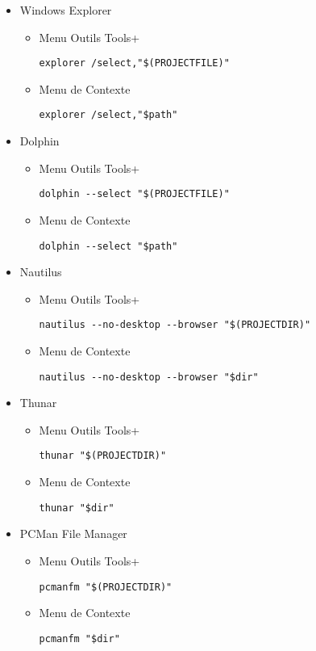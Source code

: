 \begin{itemize}
\item Windows Explorer
\begin{itemize}
\item Menu Outils Tools+
\begin{verbatim}
explorer /select,"$(PROJECTFILE)"
\end{verbatim}
\item Menu de Contexte
\begin{verbatim}
explorer /select,"$path"
\end{verbatim}
\end{itemize}

\item Dolphin
\begin{itemize}
\item Menu Outils Tools+
\begin{verbatim}
dolphin --select "$(PROJECTFILE)"
\end{verbatim}
\item Menu de Contexte
\begin{verbatim}
dolphin --select "$path"
\end{verbatim}
\end{itemize}


\item Nautilus
\begin{itemize}
\item Menu Outils Tools+
\begin{verbatim}
nautilus --no-desktop --browser "$(PROJECTDIR)"
\end{verbatim}
\item Menu de Contexte
\begin{verbatim}
nautilus --no-desktop --browser "$dir"
\end{verbatim}
\end{itemize}

\item Thunar
\begin{itemize}
\item Menu Outils Tools+
\begin{verbatim}
thunar "$(PROJECTDIR)"
\end{verbatim}
\item Menu de Contexte
\begin{verbatim}
thunar "$dir"
\end{verbatim}
\end{itemize}

\item PCMan File Manager
\begin{itemize}
\item Menu Outils Tools+
\begin{verbatim}
pcmanfm "$(PROJECTDIR)"
\end{verbatim}
\item Menu de Contexte
\begin{verbatim}
pcmanfm "$dir"
\end{verbatim}
\end{itemize}
\end{itemize}

